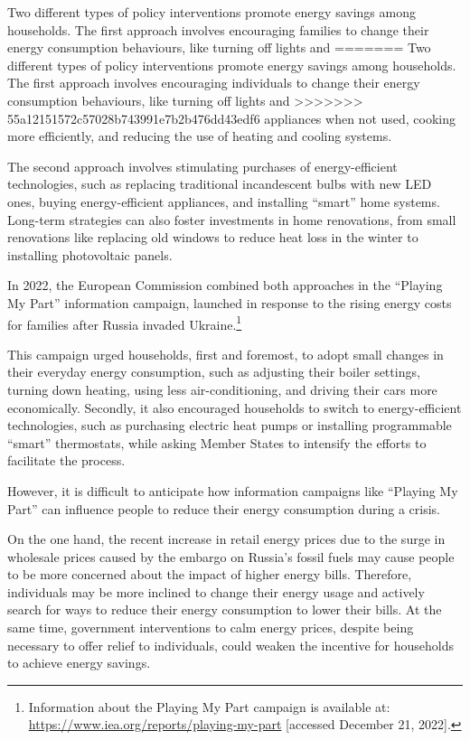 \documentclass[
  12pt,
  captions=heading]{scrreport}
\begin{document}
Two different types of policy interventions promote energy savings among
households. The first approach involves encouraging families to change
their energy consumption behaviours, like turning off lights and
=======
Two different types of policy interventions promote energy savings among
households. The first approach involves encouraging individuals to
change their energy consumption behaviours, like turning off lights and
>>>>>>> 55a12151572c57028b743991e7b2b476dd43edf6
appliances when not used, cooking more efficiently, and reducing the use
of heating and cooling systems.

The second approach involves stimulating purchases of energy-efficient
technologies, such as replacing traditional incandescent bulbs with new
LED ones, buying energy-efficient appliances, and installing ``smart''
home systems. Long-term strategies can also foster investments in home
renovations, from small renovations like replacing old windows to reduce
heat loss in the winter to installing photovoltaic panels.

In 2022, the European Commission combined both approaches in the
``Playing My Part'' information campaign, launched in response to the
rising energy costs for families after Russia invaded
Ukraine.\footnote{Information about the Playing My Part campaign is
  available at: \url{https://www.iea.org/reports/playing-my-part}
  {[}accessed December 21, 2022{]}.}

This campaign urged households, first and foremost, to adopt small
changes in their everyday energy consumption, such as adjusting their
boiler settings, turning down heating, using less air-conditioning, and
driving their cars more economically. Secondly, it also encouraged
households to switch to energy-efficient technologies, such as
purchasing electric heat pumps or installing programmable ``smart''
thermostats, while asking Member States to intensify the efforts to
facilitate the process.

However, it is difficult to anticipate how information campaigns like
``Playing My Part'' can influence people to reduce their energy
consumption during a crisis.

On the one hand, the recent increase in retail energy prices due to the
surge in wholesale prices caused by the embargo on Russia's fossil fuels
may cause people to be more concerned about the impact of higher energy
bills. Therefore, individuals may be more inclined to change their
energy usage and actively search for ways to reduce their energy
consumption to lower their bills. At the same time, government
interventions to calm energy prices, despite being necessary to offer
relief to individuals, could weaken the incentive for households to
achieve energy savings.
\end{document}
